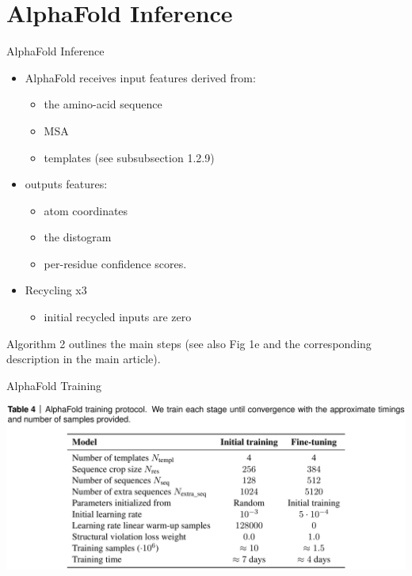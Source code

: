 \documentclass[presentation, smaller]{beamer}
\begin{document}
\section*{AlphaFold Inference}
\label{sec:org02964f4}
\begin{frame}[label={sec:org92ea69c}]{AlphaFold Inference}
\begin{itemize}
\item AlphaFold receives input features derived from:
\begin{itemize}
\item the amino-acid sequence
\item MSA
\item templates (see subsubsection 1.2.9)
\end{itemize}
\item outputs features:
\begin{itemize}
\item atom coordinates
\item the distogram
\item per-residue confidence scores.
\end{itemize}
\item Recycling x3
\begin{itemize}
\item initial recycled inputs are zero
\end{itemize}
\end{itemize}

Algorithm 2 outlines the main steps (see also Fig 1e and the corresponding description in the main article).~\cite{jumperHighlyAccurateProtein2021}
\end{frame}
\begin{frame}[label={sec:org9432228}]{AlphaFold Training}
\begin{center}
\includegraphics[width=.9\linewidth]{./imgs/af-training-table.png}
\end{center}~\cite{jumperHighlyAccurateProtein2021}
\end{frame}
\end{document}
